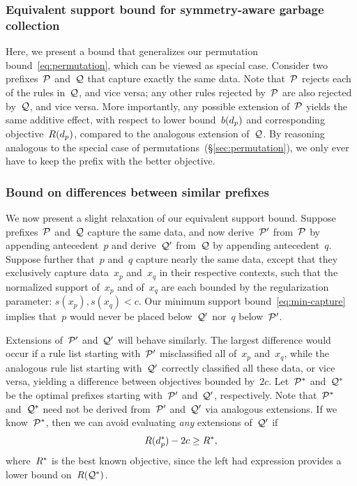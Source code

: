 \subsubsection{Equivalent support bound for symmetry-aware garbage collection}

Here, we present a bound that generalizes our permutation bound~\eqref{eq:permutation},
which can be viewed as special case.
%
Consider two prefixes~$\cal P$ and~$\cal Q$ that capture exactly the same data.
%
Note that~$\cal P$ rejects each of the rules in~$\cal Q$, and vice versa;
any other rules rejected by~$\cal P$ are also rejected by~$\cal Q$, and vice versa.
%
More importantly, any possible extension of~$\cal P$ yields the same additive effect,
with respect to lower bound~$b(d_p)$ and corresponding objective~$R(d_p)$,
compared to the analogous extension of~$\cal Q$.
%
By reasoning analogous to the special case of permutations~(\S\ref{sec:permutation}),
we only ever have to keep the prefix with the better objective.

\subsubsection{Bound on differences between similar prefixes}

We now present a slight relaxation of our equivalent support bound.
%
Suppose prefixes~$\cal P$ and~$\cal Q$ capture the same data,
and now derive~$\cal P'$ from~$\cal P$ by appending antecedent~$p$
and derive~$\cal Q'$ from~$\cal Q$ by appending antecedent~$q$.
%
Suppose further that~$p$ and~$q$ capture nearly the same data, except that
they exclusively capture data~$x_p$ and~$x_q$ in their respective contexts,
such that the normalized support of~$x_p$ and of~$x_q$ are each bounded by
the regularization parameter: ${s(x_p), s(x_q) < c}$.
%
Our minimum support bound~\eqref{eq:min-capture} implies
that~$p$ would never be placed below~$\cal Q'$ nor~$q$ below~$\cal P'$.

Extensions of~$\cal P'$ and~$\cal Q'$ will behave similarly.
%
The largest difference would occur if a rule list starting with~$\cal P'$
misclassified all of~$x_p$ and~$x_q$, while the analogous rule list starting
with~$\cal Q'$ correctly classified all these data, or vice versa,
yielding a difference between objectives bounded by~$2c$.
%
Let~$\cal P^*$ and~$\cal Q^*$ be the optimal prefixes
starting with~$\cal P'$ and~$\cal Q'$, respectively.
%
Note that~$\cal P^*$ and~$\cal Q^*$ need not be derived from~$\cal P'$ and~$\cal Q'$
via analogous extensions.
%
If we know~$\cal P^*$, then we can avoid evaluating \emph{any} extensions of~$\cal Q'$ if
\begin{align}
\Obj(\Prefix^*) - 2 c \ge \Obj^*,
\end{align}
where~$R^*$ is the best known objective, since the left had expression
provides a lower bound on~$R(\cal{Q}^*)$.

